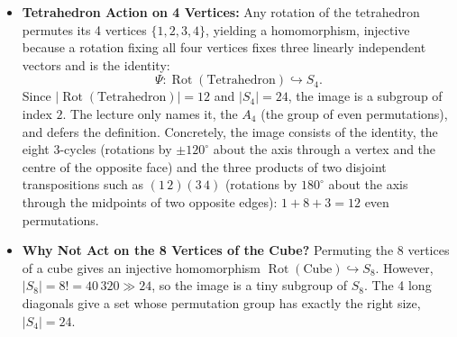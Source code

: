 \begin{content}
\begin{steps}
\begin{itemize}
    \item \textbf{Tetrahedron Action on 4 Vertices:}
    Any rotation of the tetrahedron permutes its 4 vertices $\{1, 2, 3, 4\}$, yielding a homomorphism, injective because a rotation fixing all four vertices fixes three linearly independent vectors and is the identity:
    \[
    \Psi \colon \operatorname{Rot}(\text{Tetrahedron}) \hookrightarrow S_4.
    \]
    Since $|\operatorname{Rot}(\text{Tetrahedron})| = 12$ and $|S_4| = 24$, the image is a subgroup of index $2$. The lecture only names it, the  $A_4$ (the group of even permutations), and defers the definition. Concretely, the image consists of the identity, the eight 3-cycles (rotations by $\pm 120^\circ$ about the axis through a vertex and the centre of the opposite face) and the three products of two disjoint transpositions such as $(1\,2)(3\,4)$ (rotations by $180^\circ$ about the axis through the midpoints of two opposite edges): $1 + 8 + 3 = 12$ even permutations.
    \item \textbf{Why Not Act on the 8 Vertices of the Cube?}
    Permuting the 8 vertices of a cube gives an injective homomorphism $\operatorname{Rot}(\text{Cube}) \hookrightarrow S_8$. However, $|S_8| = 8! = 40\,320 \gg 24$, so the image is a tiny subgroup of $S_8$. The 4 long diagonals give a set whose permutation group has exactly the right size, $|S_4| = 24$.
\end{itemize}
\end{steps}
\end{content}

